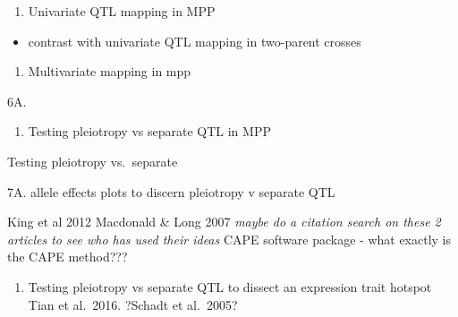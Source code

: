 \documentclass[]{article}
\providecommand{\tightlist}{%
  \setlength{\itemsep}{0pt}\setlength{\parskip}{0pt}}
\begin{document}
\begin{enumerate}
\def\labelenumi{\arabic{enumi}.}
\setcounter{enumi}{4}
\tightlist
\item
  Univariate QTL mapping in MPP
\end{enumerate}

\begin{itemize}
\tightlist
\item
  contrast with univariate QTL mapping in two-parent crosses
\end{itemize}

\begin{enumerate}
\def\labelenumi{\arabic{enumi}.}
\setcounter{enumi}{5}
\tightlist
\item
  Multivariate mapping in mpp
\end{enumerate}

6A.

\begin{enumerate}
\def\labelenumi{\arabic{enumi}.}
\setcounter{enumi}{6}
\tightlist
\item
  Testing pleiotropy vs separate QTL in MPP
\end{enumerate}

Testing pleiotropy vs.~separate

7A. allele effects plots to discern pleiotropy v separate QTL

King et al 2012 Macdonald \& Long 2007 \emph{maybe do a citation search
on these 2 articles to see who has used their ideas} CAPE software
package - what exactly is the CAPE method???

\begin{enumerate}
\def\labelenumi{\arabic{enumi}.}
\setcounter{enumi}{7}
\tightlist
\item
  Testing pleiotropy vs separate QTL to dissect an expression trait
  hotspot Tian et al.~2016. ?Schadt et al.~2005?
\end{enumerate}
\end{document}
